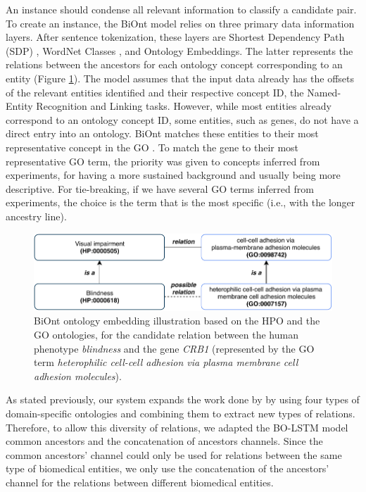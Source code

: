 An instance should condense all relevant information to classify a candidate pair. To create an instance, the BiOnt model relies on three primary data information layers. After sentence tokenization, these layers are Shortest Dependency Path (SDP) \citep{Pyysalo:2013b,mikolov2013distributed}, WordNet Classes \citep{ciaramita2006broad}, and Ontology Embeddings. The latter represents the relations between the ancestors for each ontology concept corresponding to an entity (Figure \ref{fig6}). The model assumes that the input data already has the offsets of the relevant entities identified and their respective concept ID, the Named-Entity Recognition and Linking tasks. However, while most entities already correspond to an ontology concept ID, some entities, such as genes, do not have a direct entry into an ontology. BiOnt matches these entities to their most representative concept in the \acl{GO} \citep{ashburner2000gene}. To match the gene to their most representative GO term, the priority was given to concepts inferred from experiments, for having a more sustained background and usually being more descriptive. For tie-breaking, if we have several GO terms inferred from experiments, the choice is the term that is the most specific (i.e., with the longer ancestry line).

\begin{figure}[h]
\centering
\includegraphics[width=\linewidth]{images/chapter_3/ecir_2020_6.pdf}
\caption[BiOnt Ontology Embedding Illustration]{BiOnt ontology embedding illustration based on the HPO and the GO ontologies, for the candidate relation between the human phenotype \textit{blindness} and the gene \textit{CRB1} (represented by the GO term \textit{heterophilic cell-cell adhesion via plasma membrane cell adhesion molecules}).} \label{fig6}
\end{figure}

As stated previously, our system expands the work done by \cite{lamurias2019bo} by using four types of domain-specific ontologies and combining them to extract new types of relations. Therefore, to allow this diversity of relations, we adapted the BO-LSTM model common ancestors and the concatenation of ancestors channels. Since the common ancestors' channel could only be used for relations between the same type of biomedical entities, we only use the concatenation of the ancestors' channel for the relations between different biomedical entities. 


